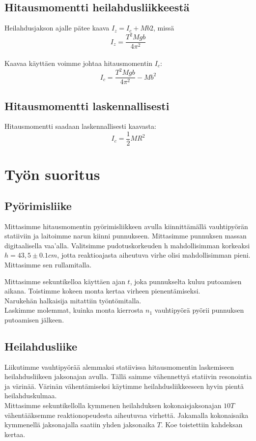 \documentclass[]{article}
\begin{document}
\subsection{Hitausmomentti
heilahdusliikkeestä}\label{hitausmomentti-heilahdusliikkeesta}

Heilahdusjakson ajalle pätee kaava \(I_z=I_c+Mb2\), missä
\[ \tag{4} I_z = \frac{T^2Mgb}{4\pi^2} \]\\
Kaavaa käyttäen voimme johtaa hitausmomentin \(I_c\):
\[ \label{hitausmomenttiheiluri}\tag{5} I_c = \frac{T^2Mgb}{4\pi^2} - Mb^2\]

\subsection{Hitausmomentti
laskennallisesti}\label{hitausmomentti-laskennallisesti}

Hitausmomentti saadaan laskennallisesti kaavasta:
\[ \label{hitausmomentti3} \tag{6} I_c = \frac{1}{2}MR^2 \]

\section{Työn suoritus}\label{tyon-suoritus}

\subsection{Pyörimisliike}\label{pyorimisliike}

Mittasimme hitausmomentin pyörimisliikkeen avulla kiinnittämällä
vauhtipyörän statiiviin ja laitoimme narun kiinni punnukseen. Mittasimme
punnuksen massan digitaalisella vaa'alla. Valitsimme pudotuskorkeuden h
mahdollisimman korkeaksi \(h=43,5\pm0.1 cm\), jotta reaktioajasta
aiheutuva virhe olisi mahdollisimman pieni. Mittasimme sen rullamitalla.

Mittasimme sekuntikelloa käyttäen ajan \(t\), joka punnukselta kuluu
putoamisen aikana. Toistimme kokeen monta kertaa virheen
pienentämiseksi.\\
Narukehän halkaisija mitattiin työntömitalla.\\
Laskimme molemmat, kuinka monta kierrosta \(n_1\) vauhtipyörä pyörii
punnuksen putoamisen jälkeen.

\subsection{Heilahdusliike}\label{heilahdusliike}

Liikutimme vauhtipyörää alemmaksi statiivissa hitausmomentin laskemiseen
heilahdusliikeen jaksonajan avulla. Tällä saimme vähennettyä statiivin
resonointia ja värinää. Värinän vähentämiseksi käytimme
heilahdusliikkeeseen hyvin pientä heilahduskulmaa.\\
Mittasimme sekuntikellolla kymmenen heilahduksen kokonaisjaksonajan
\(10T\) vähentääksemme reaktionopeudesta aiheutuvaa virhettä. Jakamalla
kokonaisaika kymmenellä jaksonajalla saatiin yhden jaksonaika \(T\). Koe
toistettiin kahdeksan kertaa.
\end{document}
